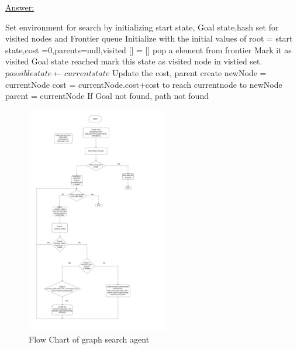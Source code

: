\documentclass[15pt,journal]{IEEEtran}
\begin{document}
\underline{Answer:}\\
\begin{algorithm}
\State Set environment for search by initializing start state, Goal state,hash set for visited nodes and Frontier queue
\State Initialize with the initial values of root = start state,cost =0,parents=null,visited [] = []
    \State pop a element from frontier
    \State Mark it as visited 
        \State Goal state reached
    \Else
        \State mark this state as visited node in vistied set.
    \State $possible state \gets current state$
                     \State Update the cost, parent
                \EndIf
            \Else
                \State create newNode  = currentNode
                \State cost = currentNode.cost+cost to reach currentnode to newNode
                \State parent = currentNode
            \EndIf
            \State If Goal not found, path not found
        \EndIf
    \EndFor
    \EndIf           
\EndWhile
\\
\end{algorithm}
\begin{figure}[H]%
\begin {center}
\includegraphics[height=0.40\textheight,width=0.55\textwidth]{image/flowchart.jpeg}
\caption{Flow Chart of graph search agent}
\label{fig:ecg}
\end {center}
\end{figure}
\end{document}
